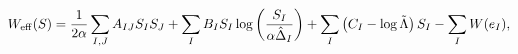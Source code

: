 \begin{equation}
W_{{\rm {eff}}}(S)=\frac{1}{2\alpha }\sum_{I,J}A_{IJ}S_{I}S_{J}+%
\sum_{I}B_{I}S_{I}\log \left( \frac{S_{I}}{\alpha \hat{\Delta}_{I}}\right)
+\sum_{I}\left( C_{I}-\log \tilde{\Lambda}\right) S_{I}-\sum_{I}W(e_{I}),
\label{EFF2}
\end{equation}

